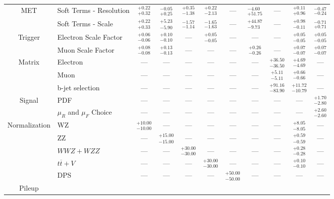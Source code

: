\begin{tabular}{|cl||ccccccc|c||c|}
\hline
\multirow{2}{*}{MET}
&Soft Terms - Resolution &  $^{+0.22}_{+0.32}$  &  $^{-0.05}_{+0.25}$  &  $^{+0.35}_{-1.38}$  &  $^{+0.22}_{-2.13}$  & --- &  $^{-4.60}_{+51.75}$  & --- &  $^{+0.11}_{+0.96}$  &  $^{-0.47}_{-0.24}$ \\ 
\cline{2-11}
&Soft Terms - Scale &  $^{+0.22}_{+0.33}$  &  $^{+5.23}_{-5.90}$  &  $^{-1.57}_{-1.14}$  &  $^{-1.65}_{-1.63}$  & --- &  $^{+44.87}_{-9.73}$  & --- &  $^{+0.98}_{-0.11}$  &  $^{-0.71}_{+0.71}$ \\ 
\hline
\multirow{2}{*}{Trigger}
&Electron Scale Factor &  $^{+0.06}_{-0.06}$  &  $^{+0.10}_{-0.10}$  & --- &  $^{+0.05}_{-0.05}$  & --- & --- & --- &  $^{+0.05}_{-0.05}$  &  $^{+0.05}_{-0.05}$ \\ 
\cline{2-11}
&Muon Scale Factor &  $^{+0.08}_{-0.08}$  &  $^{+0.13}_{-0.13}$  & --- & --- & --- &  $^{+0.26}_{-0.26}$  & --- &  $^{+0.07}_{-0.07}$  &  $^{+0.07}_{-0.07}$ \\ 
\hline
\multirow{2}{*}{Matrix}
&Electron & --- & --- & --- & --- & --- & --- &  $^{+36.50}_{-36.50}$  &  $^{+4.69}_{-4.69}$  & ---\\ 
\cline{2-11}
\multirow{2}{*}{Method}
&Muon & --- & --- & --- & --- & --- & --- &  $^{+5.11}_{-5.11}$  &  $^{+0.66}_{-0.66}$  & ---\\ 
\cline{2-11}
&b-jet selection & --- & --- & --- & --- & --- & --- &  $^{+91.16}_{-83.90}$  &  $^{+11.72}_{-10.79}$  & ---\\ 
\hline
\multirow{2}{*}{Signal}
&PDF & --- & --- & --- & --- & --- & --- & --- & --- &  $^{+1.70}_{-2.80}$ \\ 
\cline{2-11}
&$\mu_{R}$ and $\mu_{F}$ Choice & --- & --- & --- & --- & --- & --- & --- & --- &  $^{+2.60}_{-2.60}$ \\ 
\hline
\multirow{5}{*}{Normalization}
&WZ &  $^{+10.00}_{-10.00}$  & --- & --- & --- & --- & --- & --- &  $^{+8.05}_{-8.05}$  & ---\\ 
\cline{2-11}
&ZZ & --- &  $^{+15.00}_{-15.00}$  & --- & --- & --- & --- & --- &  $^{+0.59}_{-0.59}$  & ---\\ 
\cline{2-11}
&$WWZ+WZZ$ & --- & --- &  $^{+30.00}_{-30.00}$  & --- & --- & --- & --- &  $^{+0.28}_{-0.28}$  & ---\\ 
\cline{2-11}
&$t\overline{t}+V$ & --- & --- & --- &  $^{+30.00}_{-30.00}$  & --- & --- & --- &  $^{+0.10}_{-0.10}$  & ---\\ 
\cline{2-11}
&DPS & --- & --- & --- & --- &  $^{+50.00}_{-50.00}$  & --- & --- & --- & ---\\ 
\hline
\multirow{1}{*}{Pileup}

\end{tabular}
